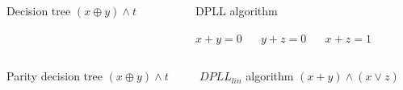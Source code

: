 \begin{frame}
    \begin{columns}
        \begin{column}{5cm}
            Decision tree
            $(x \oplus y) \land t$
            
			
        \end{column}
        \begin{column}{5cm}
            DPLL algorithm
            
            $x + y = 0$ ~~
            $y + z = 0$ ~~
            $x + z = 1$
            
            
        \end{column}
    \end{columns}

\end{frame}

\begin{frame}
    \begin{columns}
        \begin{column}{5cm}
            Parity decision tree
            $(x \oplus y) \land t$
        \end{column}
        \begin{column}{5cm}
            $DPLL_{lin}$ algorithm
            $(x + y) \land (x \lor z)$
        \end{column}
    \end{columns}

    \begin{columns}
        \begin{column}{5cm}
			
        \end{column}
        \begin{column}{5cm}
            
        \end{column}
    \end{columns}

\end{frame}


